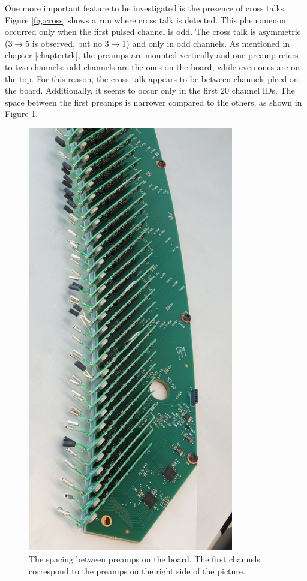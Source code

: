 One more important feature to be investigated is the presence of cross talks. Figure \ref{fig:cross} shows a run where cross talk is detected.
This phenomenon occurred only when the first pulsed channel is odd. The cross talk is asymmetric (3$\rightarrow$5 is observed, 
but no 3$\rightarrow$1) and only in odd channels.
As mentioned in chapter \ref{chaptertrk}, the preamps are mounted vertically and one preamp refers to two channels: odd channels are the ones on the board, 
while even ones are on the top. For this reason, the cross talk appears to be between channels plced on the board. 
Additionally, it seems to occur only in the first 20 channel IDs.
The space between the first preamps is narrower compared to the others, as shown in Figure \ref{fig:spacepreamps}. 
\begin{figure}[!h]
  \centering
  \includegraphics[angle=90,width=0.8\textwidth]{figures/jpg/photo_6028424923279639562_y.jpg}
  \caption{The spacing between preamps on the board. The first channels correspond to the preamps on the right side of the picture.}
 \label{fig:spacepreamps}
\end{figure}
